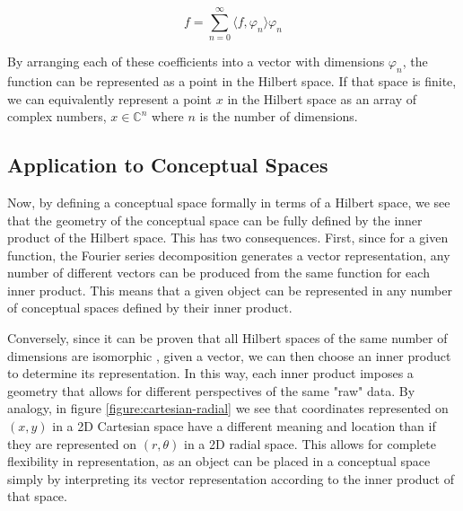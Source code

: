 \begin{equation} 
  \label{equation:fourier-series}
  f = \sum_{n=0}^\infty \langle f, \varphi_n \rangle \varphi_n
\end{equation}

By arranging each of these coefficients into a vector with dimensions $\varphi_n$, the function can be represented as a point in the Hilbert space. If that space is finite, we can equivalently represent a point $x$ in the Hilbert space as an array of complex numbers, $x \in \mathbb{C}^n$ where $n$ is the number of dimensions.

\subsection{Application to Conceptual Spaces}
\label{subsection:application-conceptual-spaces}

Now, by defining a conceptual space formally in terms of a Hilbert space, we see that the geometry of the conceptual space can be fully defined by the inner product of the Hilbert space.  This has two consequences.  First, since for a given function, the Fourier series decomposition generates a vector representation, any number of different vectors can be produced from the same function for each inner product.  This means that a given object can be represented in any number of conceptual spaces defined by their inner product.

Conversely, since it can be proven that all Hilbert spaces of the same number of dimensions are isomorphic \citep{kennedy2013hilbert}, given a vector, we can then choose an inner product to determine its representation.  In this way, each inner product imposes a geometry that allows for different perspectives of the same "raw" data.  By analogy, in figure \ref{figure:cartesian-radial} we see that coordinates represented on $(x, y)$ in a 2D Cartesian space have a different meaning and location than if they are represented on $(r, \theta)$ in a 2D radial space.  This allows for complete flexibility in representation, as an object can be placed in a conceptual space simply by interpreting its vector representation according to the inner product of that space. \citep{wiggins2018creativity}

